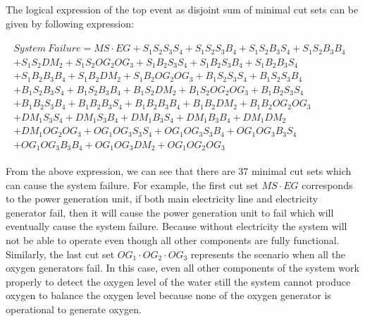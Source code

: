 \documentclass[10pt]{llncs}
\begin{document}
The logical expression of the top event as disjoint sum of minimal cut sets can be given by following expression:

\begin{align*}
\begin{split}
    System~ Failure=MS\cdot EG+S_1S_2S_3S_4+S_1S_2S_3B_4+S_1S_2B_3S_4+S_1S_2B_3B_4~~~~~~~~~~~~~~~~~~~~~~~~~~~~~~~~~\\+S_1S_2DM_2+S_1S_2OG_2OG_3	+S_1B_2S_3S_4+S_1B_2S_3B_4+S_1B_2B_3S_4~~~~~~~~~~~~~~~~~~~~~~~~~~~~~~~~~~~\\+S_1B_2B_3B_4+S_1B_2DM_2+S_1B_2OG_2OG_3+B_1S_2S_3S_4     +B_1S_2S_3B_4~~~~~~~~~~~~~~~~~~~~~~~~~~~~~~~~~\\+B_1S_2B_3S_4+B_1S_2B_3B_4+B_1S_2DM_2+B_1S_2OG_2OG_3+B_1B_2S_3S_4~~~~~~~~~~~~~~~~~~~~~~~~~~~~~~~~~\\+B_1B_2S_3B_4		+B_1B_2B_3S_4+B_1B_2B_3B_4+B_1B_2DM_2+B_1B_2OG_2OG_3~~~~~~~~~~~~~~~~~~~~~~~~~~~~~~\\+DM_1S_3S_4+DM_1S_3B_4+DM_1B_3S_4			+DM_1B_3B_4+DM_1DM_2~~~~~~~~~~~~~~~~~~~~~~~~~~~~~~~~~~~~~~~~\\+DM_1OG_2OG_3+OG_1OG_3S_3S_4+OG_1OG_3S_3B_4+OG_1OG_3B_3S_4~~~~~~~~~~~~~~~~~~~~~~~~~~~~~~~~~~~\\+OG_1OG_3B_3B_4+OG_1OG_3DM_2+OG_1OG_2OG_3~~~~~~~~~~~~~~~~~~~~~~~~~~~~~~~~~~~~~~~~~~~~~~~~~~~~~~~~~~~~~~~~~
\end{split}  
\end{align*}

From the above expression, we can see that there are 37 minimal cut sets which can cause the system failure. For example, the first cut set $MS\cdot EG$ corresponds to the power generation unit, if both main electricity line and electricity generator fail, then it will cause the power generation unit to fail which will eventually cause the system failure. Because without electricity the system will not be able to operate even though all other components are fully functional. Similarly, the last cut set $OG_1 \cdot OG_2 \cdot OG_3$ represents the scenario when all the oxygen generators fail. In this case, even all other components of the system work properly to detect the oxygen level of the water still the system cannot produce oxygen to balance the oxygen level because none of the oxygen generator is operational to generate oxygen.
\end{document}
